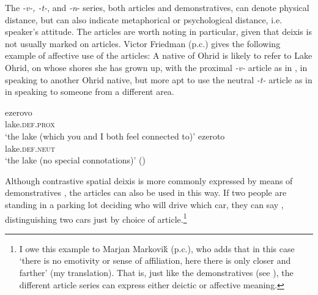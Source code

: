 \documentclass[output=paper]{langscibook}
\begin{document}
The  \textit{-v-, -t-}, and \textit{-n}- series, both articles and demonstratives, can denote physical distance, but can also indicate metaphorical or psychological distance, i.e. speaker's attitude. The articles are worth noting in particular, given that deixis is not usually marked on articles. Victor Friedman (p.c.) gives the following example of affective use of the articles: A native of Ohrid is likely to refer to Lake Ohrid, on whose shores she has grown up, with the proximal \textit{-v-} article as in , in speaking to another Ohrid native, but more apt to use the neutral \textit{-t-} article as in  in speaking to someone from a different area.

\ea\label{lake}
\ea\label{lake1}
\gll ezerovo \\
     lake.\textsc{def.prox} \\
\glt `the lake (which you and I both feel connected to)'
\ex \label{lake2}
\gll ezeroto \\
     lake.\textsc{def}.\textsc{neut} \\
\glt `the lake (no special connotations)' \hfill ()
\z\z

\noindent Although contrastive spatial deixis is more commonly expressed by means of demonstratives \citep{Karapejovski2017}, the articles can also be used in this way. If two people are standing in a parking lot deciding who will drive which car, they can say , distinguishing two cars just by choice of article.\footnote{I owe this example to Marjan Markoviḱ (p.c.), who adds that in this case `there is no emotivity or sense of affiliation, here there is only closer and farther' (my translation). That is, just like the demonstratives (see ), the different article series can express either deictic or affective meaning.}
\end{document}

